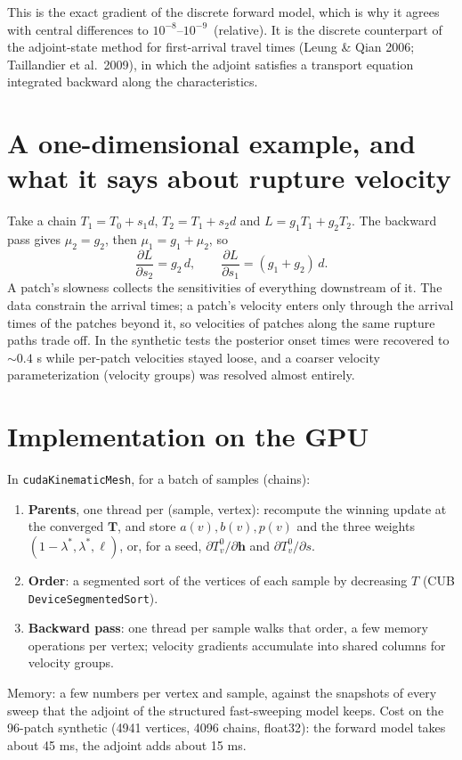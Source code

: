 \documentclass[11pt]{article}
\newcommand{\T}{\bm{T}}
\newcommand{\h}{\bm{h}}
\begin{document}
This is the exact gradient of the discrete forward model, which is why it agrees with central
differences to $10^{-8}$--$10^{-9}$\, (relative). It is the discrete counterpart of the
adjoint-state method for first-arrival travel times (Leung \& Qian 2006; Taillandier et al.\ 2009),
in which the adjoint satisfies a transport equation integrated backward along the characteristics.

\section{A one-dimensional example, and what it says about rupture velocity}

Take a chain $T_1 = T_0 + s_1 d$, $T_2 = T_1 + s_2 d$ and $L = g_1 T_1 + g_2 T_2$. The backward
pass gives $\mu_2 = g_2$, then $\mu_1 = g_1 + \mu_2$, so
\[
\frac{\partial L}{\partial s_2} = g_2\, d, \qquad \frac{\partial L}{\partial s_1} = (g_1 + g_2)\, d .
\]
A patch's slowness collects the sensitivities of everything downstream of it. The data constrain
the arrival times; a patch's velocity enters only through the arrival times of the patches beyond
it, so velocities of patches along the same rupture paths trade off. In the synthetic tests the
posterior onset times were recovered to $\sim0.4$ s while per-patch velocities stayed loose, and a
coarser velocity parameterization (velocity groups) was resolved almost entirely.

\section{Implementation on the GPU}

In \texttt{cudaKinematicMesh}, for a batch of samples (chains):
\begin{enumerate}
\item \textbf{Parents}, one thread per (sample, vertex): recompute the winning update at the
converged $\T$, and store $a(v), b(v), p(v)$ and the three weights $(1-\lambda^\ast, \lambda^\ast, \ell)$,
or, for a seed, $\partial T^0_v/\partial\h$ and $\partial T^0_v/\partial s$.
\item \textbf{Order}: a segmented sort of the vertices of each sample by decreasing $T$
(CUB \texttt{DeviceSegmentedSort}).
\item \textbf{Backward pass}: one thread per sample walks that order, a few memory operations per
vertex; velocity gradients accumulate into shared columns for velocity groups.
\end{enumerate}
Memory: a few numbers per vertex and sample, against the snapshots of every sweep that the
adjoint of the structured fast-sweeping model keeps. Cost on the 96-patch synthetic (4941 vertices,
4096 chains, float32): the forward model takes about 45 ms, the adjoint adds about 15 ms.
\end{document}
